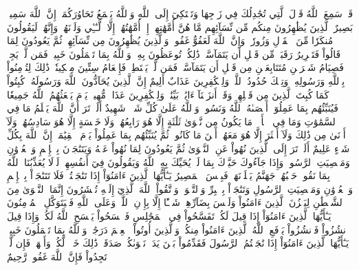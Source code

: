 قَدۡ سَمِعَ ٱللَّهُ قَوۡلَ ٱلَّتِي تُجَٰدِلُكَ فِي زَوۡجِهَا وَتَشۡتَكِيٓ إِلَى ٱللَّهِ وَٱللَّهُ يَسۡمَعُ تَحَاوُرَكُمَآۚ إِنَّ ٱللَّهَ سَمِيعُۢ بَصِيرٌ
ٱلَّذِينَ يُظَٰهِرُونَ مِنكُم مِّن نِّسَآئِهِم مَّا هُنَّ أُمَّهَٰتِهِمۡۖ إِنۡ أُمَّهَٰتُهُمۡ إِلَّا ٱلَّـٰٓـِٔي وَلَدۡنَهُمۡۚ وَإِنَّهُمۡ لَيَقُولُونَ مُنكَرٗا مِّنَ ٱلۡقَوۡلِ وَزُورٗاۚ وَإِنَّ ٱللَّهَ لَعَفُوٌّ غَفُورٞ
وَٱلَّذِينَ يُظَٰهِرُونَ مِن نِّسَآئِهِمۡ ثُمَّ يَعُودُونَ لِمَا قَالُواْ فَتَحۡرِيرُ رَقَبَةٖ مِّن قَبۡلِ أَن يَتَمَآسَّاۚ ذَٰلِكُمۡ تُوعَظُونَ بِهِۦۚ وَٱللَّهُ بِمَا تَعۡمَلُونَ خَبِيرٞ
فَمَن لَّمۡ يَجِدۡ فَصِيَامُ شَهۡرَيۡنِ مُتَتَابِعَيۡنِ مِن قَبۡلِ أَن يَتَمَآسَّاۖ فَمَن لَّمۡ يَسۡتَطِعۡ فَإِطۡعَامُ سِتِّينَ مِسۡكِينٗاۚ ذَٰلِكَ لِتُؤۡمِنُواْ بِٱللَّهِ وَرَسُولِهِۦۚ وَتِلۡكَ حُدُودُ ٱللَّهِۗ وَلِلۡكَٰفِرِينَ عَذَابٌ أَلِيمٌ
إِنَّ ٱلَّذِينَ يُحَآدُّونَ ٱللَّهَ وَرَسُولَهُۥ كُبِتُواْ كَمَا كُبِتَ ٱلَّذِينَ مِن قَبۡلِهِمۡۚ وَقَدۡ أَنزَلۡنَآ ءَايَٰتِۭ بَيِّنَٰتٖۚ وَلِلۡكَٰفِرِينَ عَذَابٞ مُّهِينٞ
يَوۡمَ يَبۡعَثُهُمُ ٱللَّهُ جَمِيعٗا فَيُنَبِّئُهُم بِمَا عَمِلُوٓاْۚ أَحۡصَىٰهُ ٱللَّهُ وَنَسُوهُۚ وَٱللَّهُ عَلَىٰ كُلِّ شَيۡءٖ شَهِيدٌ
أَلَمۡ تَرَ أَنَّ ٱللَّهَ يَعۡلَمُ مَا فِي ٱلسَّمَٰوَٰتِ وَمَا فِي ٱلۡأَرۡضِۖ مَا يَكُونُ مِن نَّجۡوَىٰ ثَلَٰثَةٍ إِلَّا هُوَ رَابِعُهُمۡ وَلَا خَمۡسَةٍ إِلَّا هُوَ سَادِسُهُمۡ وَلَآ أَدۡنَىٰ مِن ذَٰلِكَ وَلَآ أَكۡثَرَ إِلَّا هُوَ مَعَهُمۡ أَيۡنَ مَا كَانُواْۖ ثُمَّ يُنَبِّئُهُم بِمَا عَمِلُواْ يَوۡمَ ٱلۡقِيَٰمَةِۚ إِنَّ ٱللَّهَ بِكُلِّ شَيۡءٍ عَلِيمٌ
أَلَمۡ تَرَ إِلَى ٱلَّذِينَ نُهُواْ عَنِ ٱلنَّجۡوَىٰ ثُمَّ يَعُودُونَ لِمَا نُهُواْ عَنۡهُ وَيَتَنَٰجَوۡنَ بِٱلۡإِثۡمِ وَٱلۡعُدۡوَٰنِ وَمَعۡصِيَتِ ٱلرَّسُولِۖ وَإِذَا جَآءُوكَ حَيَّوۡكَ بِمَا لَمۡ يُحَيِّكَ بِهِ ٱللَّهُ وَيَقُولُونَ فِيٓ أَنفُسِهِمۡ لَوۡلَا يُعَذِّبُنَا ٱللَّهُ بِمَا نَقُولُۚ حَسۡبُهُمۡ جَهَنَّمُ يَصۡلَوۡنَهَاۖ فَبِئۡسَ ٱلۡمَصِيرُ
يَـٰٓأَيُّهَا ٱلَّذِينَ ءَامَنُوٓاْ إِذَا تَنَٰجَيۡتُمۡ فَلَا تَتَنَٰجَوۡاْ بِٱلۡإِثۡمِ وَٱلۡعُدۡوَٰنِ وَمَعۡصِيَتِ ٱلرَّسُولِ وَتَنَٰجَوۡاْ بِٱلۡبِرِّ وَٱلتَّقۡوَىٰۖ وَٱتَّقُواْ ٱللَّهَ ٱلَّذِيٓ إِلَيۡهِ تُحۡشَرُونَ
إِنَّمَا ٱلنَّجۡوَىٰ مِنَ ٱلشَّيۡطَٰنِ لِيَحۡزُنَ ٱلَّذِينَ ءَامَنُواْ وَلَيۡسَ بِضَآرِّهِمۡ شَيۡـًٔا إِلَّا بِإِذۡنِ ٱللَّهِۚ وَعَلَى ٱللَّهِ فَلۡيَتَوَكَّلِ ٱلۡمُؤۡمِنُونَ
يَـٰٓأَيُّهَا ٱلَّذِينَ ءَامَنُوٓاْ إِذَا قِيلَ لَكُمۡ تَفَسَّحُواْ فِي ٱلۡمَجَٰلِسِ فَٱفۡسَحُواْ يَفۡسَحِ ٱللَّهُ لَكُمۡۖ وَإِذَا قِيلَ ٱنشُزُواْ فَٱنشُزُواْ يَرۡفَعِ ٱللَّهُ ٱلَّذِينَ ءَامَنُواْ مِنكُمۡ وَٱلَّذِينَ أُوتُواْ ٱلۡعِلۡمَ دَرَجَٰتٖۚ وَٱللَّهُ بِمَا تَعۡمَلُونَ خَبِيرٞ
يَـٰٓأَيُّهَا ٱلَّذِينَ ءَامَنُوٓاْ إِذَا نَٰجَيۡتُمُ ٱلرَّسُولَ فَقَدِّمُواْ بَيۡنَ يَدَيۡ نَجۡوَىٰكُمۡ صَدَقَةٗۚ ذَٰلِكَ خَيۡرٞ لَّكُمۡ وَأَطۡهَرُۚ فَإِن لَّمۡ تَجِدُواْ فَإِنَّ ٱللَّهَ غَفُورٞ رَّحِيمٌ
